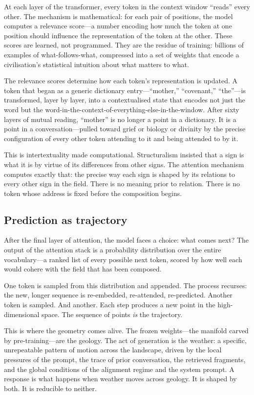 At each layer of the transformer, every token in the context window ``reads'' every other. The mechanism is mathematical: for each pair of positions, the model computes a relevance score---a number encoding how much the token at one position should influence the representation of the token at the other. These scores are learned, not programmed. They are the residue of training: billions of examples of what-follows-what, compressed into a set of weights that encode a civilisation's statistical intuition about what matters to what.

The relevance scores determine how each token's representation is updated. A token that began as a generic dictionary entry---``mother,'' ``covenant,'' ``the''---is transformed, layer by layer, into a contextualised state that encodes not just the word but the word-in-the-context-of-everything-else-in-the-window. After sixty layers of mutual reading, ``mother'' is no longer a point in a dictionary. It is a point in a conversation---pulled toward grief or biology or divinity by the precise configuration of every other token attending to it and being attended to by it.

This is intertextuality made computational. Structuralism insisted that a sign is what it is by virtue of its differences from other signs. The attention mechanism computes exactly that: the precise way each sign is shaped by its relations to every other sign in the field. There is no meaning prior to relation. There is no token whose address is fixed before the composition begins.

\subsection{Prediction as trajectory}

After the final layer of attention, the model faces a choice: what comes next? The output of the attention stack is a probability distribution over the entire vocabulary---a ranked list of every possible next token, scored by how well each would cohere with the field that has been composed.

One token is sampled from this distribution and appended. The process recurses: the new, longer sequence is re-embedded, re-attended, re-predicted. Another token is sampled. And another. Each step produces a new point in the high-dimensional space. The sequence of points \emph{is} the trajectory.

This is where the geometry comes alive. The frozen weights---the manifold carved by pre-training---are the geology. The act of generation is the weather: a specific, unrepeatable pattern of motion across the landscape, driven by the local pressures of the prompt, the trace of prior conversation, the retrieved fragments, and the global conditions of the alignment regime and the system prompt. A response is what happens when weather moves across geology. It is shaped by both. It is reducible to neither.

